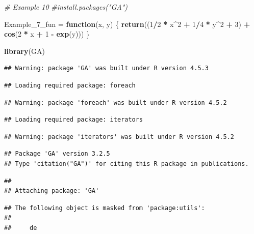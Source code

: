 \documentclass[
]{article}
\newenvironment{Shaded}{\begin{snugshade}}{\end{snugshade}}
\newcommand{\CommentTok}[1]{\textcolor[rgb]{0.56,0.35,0.01}{\textit{#1}}}
\newcommand{\ControlFlowTok}[1]{\textcolor[rgb]{0.13,0.29,0.53}{\textbf{#1}}}
\newcommand{\DecValTok}[1]{\textcolor[rgb]{0.00,0.00,0.81}{#1}}
\newcommand{\FunctionTok}[1]{\textcolor[rgb]{0.13,0.29,0.53}{\textbf{#1}}}
\newcommand{\NormalTok}[1]{#1}
\newcommand{\OtherTok}[1]{\textcolor[rgb]{0.56,0.35,0.01}{#1}}
\newcommand{\SpecialCharTok}[1]{\textcolor[rgb]{0.81,0.36,0.00}{\textbf{#1}}}
\begin{document}
\begin{Shaded}
\begin{Highlighting}[]
\CommentTok{\# Example 10}
\CommentTok{\#install.packages("GA")}

\NormalTok{Example\_7\_fun }\OtherTok{=} \ControlFlowTok{function}\NormalTok{(x, y) \{}
    \FunctionTok{return}\NormalTok{((}\DecValTok{1}\SpecialCharTok{/}\DecValTok{2} \SpecialCharTok{*}\NormalTok{ x}\SpecialCharTok{\^{}}\DecValTok{2} \SpecialCharTok{+} \DecValTok{1}\SpecialCharTok{/}\DecValTok{4} \SpecialCharTok{*}\NormalTok{ y}\SpecialCharTok{\^{}}\DecValTok{2} \SpecialCharTok{+} \DecValTok{3}\NormalTok{) }\SpecialCharTok{+} \FunctionTok{cos}\NormalTok{(}\DecValTok{2} \SpecialCharTok{*}\NormalTok{ x }\SpecialCharTok{+} \DecValTok{1} \SpecialCharTok{{-}} \FunctionTok{exp}\NormalTok{(y)))}
\NormalTok{\}}

\FunctionTok{library}\NormalTok{(GA)}
\end{Highlighting}
\end{Shaded}

\begin{verbatim}
## Warning: package 'GA' was built under R version 4.5.3
\end{verbatim}

\begin{verbatim}
## Loading required package: foreach
\end{verbatim}

\begin{verbatim}
## Warning: package 'foreach' was built under R version 4.5.2
\end{verbatim}

\begin{verbatim}
## Loading required package: iterators
\end{verbatim}

\begin{verbatim}
## Warning: package 'iterators' was built under R version 4.5.2
\end{verbatim}

\begin{verbatim}
## Package 'GA' version 3.2.5
## Type 'citation("GA")' for citing this R package in publications.
\end{verbatim}

\begin{verbatim}
## 
## Attaching package: 'GA'
\end{verbatim}

\begin{verbatim}
## The following object is masked from 'package:utils':
## 
##     de
\end{verbatim}
\end{document}
